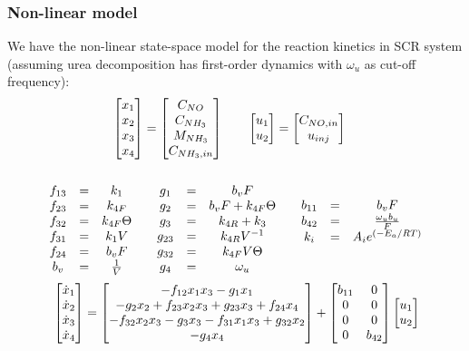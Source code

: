 \subsubsection{Non-linear model}
We have the non-linear state-space model for the reaction kinetics in SCR
system (assuming urea decomposition has first-order dynamics with $\omega_u$ as
cut-off frequency):
\begin{align*}
    \begin{bmatrix} x_1 \\ x_2 \\ x_3 \\ x_4 \end{bmatrix} = \begin{bmatrix} C_{NO} \\ C_{NH_3} \\ M_{NH_3} \\ C_{NH_3, in} \end{bmatrix} \qquad &
    \begin{bmatrix} u_1 \\ u_2  \end{bmatrix} = \begin{bmatrix} C_{NO, in} \\ u_{inj} \end{bmatrix}
\end{align*}
\begin{align*}
    \begin{matrix} 
    \\f_{13} &=& k_1
    \\f_{23} &=& k_{4F}
    \\f_{32} &=& k_{4F} \Theta
    \\f_{31} &=& k_1 V
    \\f_{24} &=& b_v F
    \\ b_v &=& \frac{1}{V}
     \end{matrix}
    \qquad
    \begin{matrix} 
    \\ g_1    &=& b_v F
    \\ g_2    &=& b_v F + k_{4F} \Theta
    \\ g_{3}  &=& k_{4R}+k_3
    \\ g_{23} &=& k_{4R} V^{-1}
    \\ g_{32} &=& k_{4F} V \Theta
    \\ g_4 &=& \omega_u
     \end{matrix}
    \qquad
    \begin{matrix} 
        b_{11} &=& b_v F
        \\
        b_{42} &=& \frac{\omega_u b_u}{F}
        \\ k_i &=& A_i e^{\left( -E_a/RT \right)}
     \end{matrix}
\end{align*}
\begin{equation}{\label{eqn::ctrl_state}}
     \begin{bmatrix} \dot x_1 \\
        \dot x_2\\
        \dot x_3\\
        \dot x_4 \end{bmatrix} =
    \begin{bmatrix} 
        -f_{12} x_1 x_3
        -g_1 x_1
        \\
        -g_2 x_2
        + f_{23} x_2 x_3
        + g_{23} x_3
        + f_{24} x_4
        \\
        -f_{32} x_2 x_3
        -g_3 x_3
        -f_{31} x_1 x_3
        + g_{32} x_2
        \\
        -g_4 x_4
     \end{bmatrix}
    + \begin{bmatrix} b_{11} & 0\\
          0     & 0\\
          0     & 0\\
          0     & b_{42}   \end{bmatrix}\begin{bmatrix} u_1 \\ u_2  \end{bmatrix}
\end{equation}
